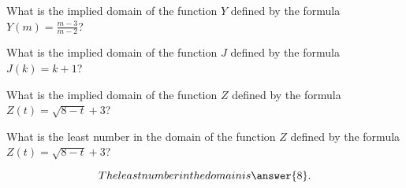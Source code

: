 \documentclass{ximera}
\begin{document}
\begin{exercise}
What is the implied domain of the function $Y$ defined by the formula $Y(m) = \frac{m-3}{m-2}$?

\begin{multipleChoice}
\choice{$(-\infty, \infty)$}
\end{multipleChoice}

\end{exercise}





\begin{exercise}
What is the implied domain of the function $J$ defined by the formula $J(k) = k+1$?

\begin{multipleChoice}
\choice[correct]{$(-\infty, \infty)$}
\end{multipleChoice}

\end{exercise}





\begin{exercise}
What is the implied domain of the function $Z$ defined by the formula $Z(t) = \sqrt{8-t} + 3$?

\begin{multipleChoice}
\choice{$(-\infty, \infty)$}
\end{multipleChoice}

\end{exercise}



\begin{exercise}
What is the least number in the domain of the function $Z$ defined by the formula $Z(t) = \sqrt{8-t} + 3$?

\[
The least number in the domain is \answer{8}.

\]

\end{exercise}
\end{document}
